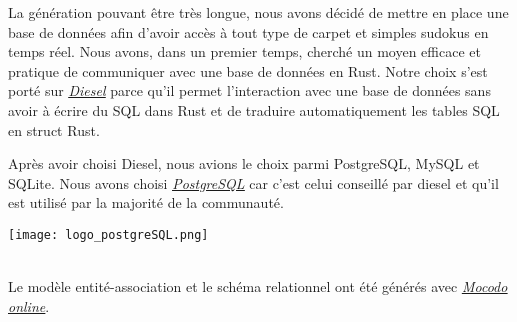\documentclass[a4paper]{article}
\begin{document}
\begin{justify}
    \qquad La génération pouvant être très longue, nous avons décidé de mettre en place une base de données afin d'avoir accès à tout type de carpet et simples sudokus en temps réel. Nous avons, dans un premier temps, cherché un moyen efficace et pratique de communiquer avec une base de données en Rust. Notre choix s'est porté sur \href{https://diesel.rs/guides/getting-started}{\uline{\textit{Diesel}}} parce qu'il permet l'interaction avec une base de données sans avoir à écrire du SQL dans Rust et de traduire automatiquement les tables SQL en struct Rust.

    Après avoir choisi Diesel, nous avions le choix parmi PostgreSQL, MySQL et SQLite. Nous avons choisi \href{https://www.postgresql.org/}{\uline{\textit{PostgreSQL}}} car c'est celui conseillé par diesel et qu'il est utilisé par la majorité de la communauté. \\

    \begin{minipage}[t]{0.49\textwidth}
        \centering
        
        \captionsetup{hypcap=false}
    \end{minipage}
    \hfill
    \begin{minipage}[t]{0.49\textwidth}
        \centering
        \texttt{[image: logo\_postgreSQL.png]}
        \captionsetup{hypcap=false}
    \end{minipage}
    \\

    \noindent Le modèle entité-association et le schéma relationnel ont été générés avec \href{https://www.mocodo.net/?mcd=eNq1U8tq20AU3esrbhcmCTgBd-mdagsjkF2wTaGEIiajK2vIaEaZR4jzB_2SEgr9ge7iP8mXdCT5KSteBFfajM65j3Pv0XQ65368Dpz5OV1yGPqjqT8eBzANIn8efp1Mgggue1cfL_lxlQNJM3yG198wZGShSJ4jKOTEMCkEckABY0llIuH1bxcUSRVZ_aEZ09plcQIpW1iFgAYI5w6qq2ppNfALKRbcMb41CrUDlWGob-BbyS7BKGkfXYoVYPDJ4LXLUhThwSI8liFFzdclqSwYqmsqXRsFl2-_fl4Bo6wMUi6cKSBFQUp1rllZk5RdwSwLhARB02z1kpOb_77S8_-e3oAIKRglfGYTeW9nD5a4ffZBV4eYJXA7G_tRFE7mn350N3BGdAa3X8JRBXv96vUGUhgUTHWh14P2wo6aNCndFFG2rw5xypwjSXwniUoaTbubGNFQWKN0U7JOdnnf54HvtA5XLwWKRGGvVUub9hHJ8UhkBW6FLtxXvaxgGvrRTkfC0pRRy82yVeaOjjWV7p9qC1pvgSLnejtIKxtTaYXZL-I5Y0JBubtI7827Bw6IKtDsxmIiwaeDcpXRfe84g1aH046tYxqOrdGNnTa_c5ewLaIgxqASp7hYs-eDJe78_tw66qHfNdjwew_cjtnwe0_Ie4Yf0W2GHy6xaXgLe2z4P0rA9Sc=}{\uline{\textit{Mocodo online}}}.
\end{justify}
\end{document}
